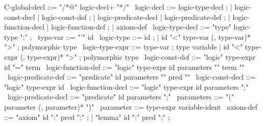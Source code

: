 \begin{syntax}
  C-global-decl ::= "/*@" logic-decl+ "*/"
  \
  logic-decl ::= logic-type-decl ;
          | logic-const-decl | logic-const-def ;
          | logic-predicate-decl | logic-predicate-def ;
          | logic-function-decl | logic-function-def ;
          | axiom-def
  \
  logic-type-decl ::= "type" logic-type ";" ; 
  \
  type-var ::= "'" id 
  \
  logic-type ::= id ;
  | id "<" type-var (, type-var)* ">" ; polymorphic type
  \
  logic-type-expr ::= type-var ; type variable
  | id "<" type-expr (, type-expr)* ">" ; polymorphic type
  \
  logic-const-def ::= "logic" type-expr id "=" term
  \
  logic-function-def ::= "logic" type-expr id parameters "{" term "}"
  \
  logic-predicate-def ::= "predicate" id parameters "{" pred "}"
  \
  logic-const-decl ::= "logic" type-expr id 
  \
  logic-function-decl ::= "logic" type-expr id parameters ";"
  \
  logic-predicate-decl ::= "predicate" id parameters ";"
  \
  parameters ::= "(" parameter (, parameter)* ")"
  \
  parameter ::= type-expr variable-ident  
  \
  axiom-def ::= "axiom" id ":" pred ";" ;
  | "lemma" id ":" pred ";" ;
\end{syntax}